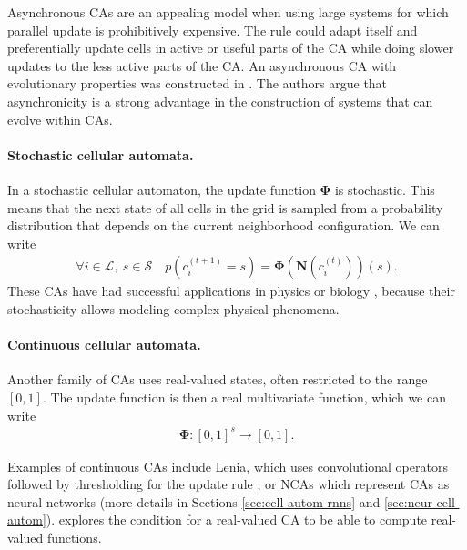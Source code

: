 Asynchronous \acp{CA} are an appealing model when using large systems for which
parallel update is prohibitively expensive. The rule could adapt itself and
preferentially update cells in active or useful parts of the \ac{CA} while doing
slower updates to the less active parts of the \ac{CA}. An asynchronous \ac{CA}
with evolutionary properties was constructed in
\parencite{nehanivEvolutionAsynchronousCellular2003}. The authors argue that
asynchronicity is a strong advantage in the construction of systems that can evolve
within \acp{CA}.

\paragraph{Stochastic cellular automata.}
In a stochastic cellular automaton, the update function $\boldsymbol{\Phi}$ is
stochastic. This means that the next state of all cells in the grid is
sampled from a probability distribution that depends on the current neighborhood
configuration. We can write
\begin{equation}
\begin{aligned}
  \forall i \in \mathcal{L},\ s \in \mathcal{S} \quad p\left(c_{i}^{(t + 1)} = s \right) = \boldsymbol{\Phi} \left(\boldsymbol{N}\left(c_{i}^{(t)}\right)\right)(s).
\end{aligned}
\end{equation}
These \acp{CA} have had successful applications in physics
\parencite{vichniacSimulatingPhysicsCellular1984,
  ottaviSimulationIsingModel1989} or biology
\parencite{boasCellularPottsModel2018}, because their stochasticity allows
modeling complex physical phenomena.

\paragraph{Continuous cellular automata.}
Another family of \acp{CA} uses real-valued states, often restricted to the range
$[0, 1]$. The update function is then a real multivariate function, which we can
write
\begin{equation}
  \begin{aligned}
  \boldsymbol{\Phi}: [0, 1]^{s} \rightarrow [0, 1].
  \end{aligned}
  \label{eq:phi_cont}
\end{equation}

Examples of continuous \acp{CA} include Lenia, which uses convolutional operators
followed by thresholding for the update rule
\parencite{chanLeniaBiologyArtificial2019a}, or \acp{NCA}
\parencite{mordvintsevGrowingNeuralCellular2020} which represent \acp{CA} as
neural networks (more details in Sections \ref{sec:cell-autom-rnns} and
\ref{sec:neur-cell-autom}). \textcite{garzonRealComputationCellular1993}
explores the condition for a real-valued \ac{CA} to be able to compute
real-valued functions.

